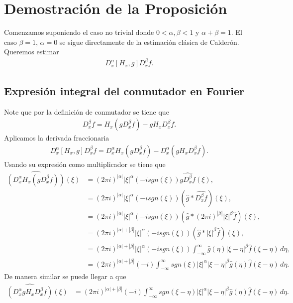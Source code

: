 \documentclass{aleph-revista}
\renewcommand{\hat}{\widehat}
\begin{document}
\section{Demostración de la Proposición}
Comenzamos suponiendo el caso no trivial donde $0 < \alpha, \beta < 1$ y $\alpha + \beta = 1$. El caso $\beta = 1$, $\alpha = 0$ se sigue directamente de la estimación clásica de Calderón.\\
Queremos estimar
\begin{align*}
  D_x^\alpha [H_x, g] D_x^\beta f. 
\end{align*}

\subsection*{Expresión integral del conmutador en Fourier}
  Note que por la definición de conmutador se tiene que
  \begin{align*}
    [H_x, g] D_x^\beta f = H_x(g D_x^\beta f) - g H_x D_x^\beta f. 
  \end{align*}
  Aplicamos la derivada fraccionaria
  \begin{align*}
    D_x^\alpha [H_x, g] D_x^\beta f = D_x^\alpha H_x(g D_x^\beta f) - D_x^\alpha (g H_x D_x^\beta f). 
  \end{align*}
  Usando su expresión como multiplicador se tiene que
  \begin{align*}
    \hat{\left(D_{x}^{\alpha}H_{x}(gD_{x}^{\beta}f)\right)}(\xi)&=(2\pi i)^{|\alpha|}|\xi|^{\alpha}(-i sgn(\xi))\hat{gD_{x}^{\beta}f}(\xi),\\
    &=(2\pi i)^{|\alpha|}|\xi|^{\alpha}(-i sgn(\xi))\left(\hat{g}*\hat{D_{x}^{\beta}f}\right)(\xi),\\
    &=(2\pi i)^{|\alpha|}|\xi|^{\alpha}(-i sgn(\xi))\left(\hat{g}*(2\pi i)^{|\beta|}|\xi|^{\beta}\hat{f}\right)(\xi),\\
    &=(2\pi i)^{|\alpha|+|\beta|}|\xi|^{\alpha}(-i sgn(\xi))\left(\hat{g}*|\xi|^{\beta}\hat{f}\right)(\xi),\\
    &=(2\pi i)^{|\alpha|+|\beta|}|\xi|^{\alpha}(-i sgn(\xi))\int_{-\infty}^{\infty}\hat{g}(\eta)|\xi-\eta|^{\beta}\hat{f}(\xi-\eta)\, d\eta,\\
    &=(2\pi i)^{|\alpha|+|\beta|}(-i)\int_{-\infty}^{\infty}sgn(\xi)|\xi|^{\alpha}|\xi-\eta|^{\beta}\hat{g}(\eta)\hat{f}(\xi-\eta)\, d\eta.
  \end{align*}
  De manera similar se puede llegar a que
  \begin{align*}
    \hat{\left( D_{x}^{\alpha}gH_{x}D_{x}^{\beta}f \right)}(\xi)&=(2\pi i)^{|\alpha|+|\beta|}(-i)\int_{-\infty}^{\infty}sgn(\xi-\eta)|\xi|^{\alpha}|\xi-\eta|^{\beta}\hat{g}(\eta)\hat{f}(\xi-\eta)\, d\eta.
  \end{align*}
\end{document}
